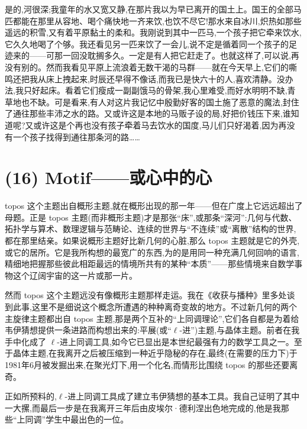  是的,河很深;我童年的水又宽又静,在那片我以为早已离开的国土上。国王的全部马匹都能在那里从容地、喝个痛快地一齐来饮,也饮不尽它!那水来自冰川,炽热如那些遥远的积雪,又有着平原黏土的柔和。我刚说到其中一匹马,一个孩子把它牵来饮水,它久久地喝了个够。我还看见另一匹来饮了一会儿,说不定是循着同一个孩子的足迹来的——可那一回没耽搁多久。一定是有人把它赶走了。也就这样了,可以说,再没有别的。然而我看见平原上流浪着无数干渴的马群——就在今天早上,它们的嘶鸣还把我从床上拽起来,时辰还早得不像话,而我已是快六十的人,喜欢清静。没办法,我只好起床。看着它们瘦成一副副饿马的骨架,我心里难受,而好水明明不缺,青草地也不缺。可是看来,有人对这片我记忆中殷勤好客的国土施了恶意的魔法,封住了通往那些丰沛之水的路。又或许这是本地的马贩子设的局,好把价钱压下来,谁知道呢?又或许这是个再也没有孩子牵着马去饮水的国度,马儿们只好渴着,因为再没有一个孩子找得到通往那条河的路……

\section{(16) Motif——或心中的心}

topos 这个主题出自概形主题,就在概形出现的那一年——但在广度上它远远超出了母题。正是 topos 主题(而非概形主题)才是那张“床”,或那条“深河”:几何与代数、拓扑学与算术、数理逻辑与范畴论、连续的世界与“不连续”或“离散”结构的世界,都在那里结亲。如果说概形主题好比新几何的心脏,那么 topos 主题就是它的外壳,或它的居所。它是我所构想的最宽广的东西,为的是用同一种充满几何回响的语言,精细地把握那些彼此相距最远的情境所共有的某种“本质”——那些情境来自数学事物这个辽阔宇宙的这一片或那一片。

然而 topos 这个主题远没有像概形主题那样走运。我在《收获与播种》里多处谈到此事,这里不是细说这个概念所遭遇的种种离奇变故的地方。不过新几何的两个主旋律主题都出自 topos 主题,那是两个互补的“上同调理论”,它们各自都是为着给韦伊猜想提供一条进路而构想出来的:平展(或“$\ell$-进”)主题,与晶体主题。前者在我手中化成了 $\ell$-进上同调工具,如今它已显出是本世纪最强有力的数学工具之一。至于晶体主题,在我离开之后被压缩到一种近乎隐秘的存在,最终(在需要的压力下)于1981年6月被发掘出来,在聚光灯下,用一个化名,而情形比围绕 topos 的那些还要离奇。

正如所预料的,$\ell$-进上同调工具成了建立韦伊猜想的基本工具。我自己证明了其中一大摞,而最后一步是在我离开三年后由皮埃尔·德利涅出色地完成的,他是我那些“上同调”学生中最出色的一位。

